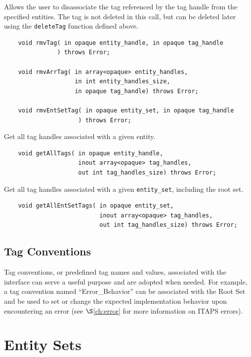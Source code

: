 \documentclass{article}
\begin{document}
Allows the user to disassociate the tag referenced by the tag 
handle from the specified entities. The tag is not deleted in 
this call, but can be deleted later using the {\tt deleteTag} function 
defined above. 
\begin{verbatim}
    void rmvTag( in opaque entity_handle, in opaque tag_handle
               ) throws Error;

    void rmvArrTag( in array<opaque> entity_handles, 
                    in int entity_handles_size,  
                    in opaque tag_handle) throws Error;

    void rmvEntSetTag( in opaque entity_set, in opaque tag_handle
                     ) throws Error;

\end{verbatim}

Get all tag handles associated with a given entity.
\begin{verbatim}
    void getAllTags( in opaque entity_handle,  
                     inout array<opaque> tag_handles, 
                     out int tag_handles_size) throws Error;
\end{verbatim}

Get all tag handles associated with a given {\tt entity\_set}, including 
the root set.

\begin{verbatim}
    void getAllEntSetTags( in opaque entity_set, 
                           inout array<opaque> tag_handles,  
                           out int tag_handles_size) throws Error;
\end{verbatim}

\subsection{Tag Conventions}

Tag conventions, or predefined tag names and values, associated 
with the interface can serve a useful purpose and are adopted 
when needed. For example, a tag convention named ``Error\_Behavior'' 
can be associated with the Root Set and be used to set or change 
the expected implementation behavior upon encountering an error 
(see $\S$\ref{ch:error} for more information on ITAPS errors).


\section{Entity Sets}
\end{document}
